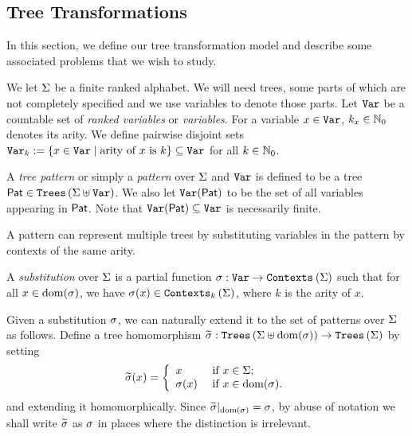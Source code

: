 \subsection{Tree Transformations}\label{subsec:model}

In this section, we define our tree transformation model and describe some associated problems that we wish to study. 

We let $\Sigma$ be a finite ranked alphabet. We will need trees, some parts of which are not completely specified and we use variables to denote those parts. Let $\texttt{Var}$ be a countable set of \emph{ranked variables} or \emph{variables}. For a variable $x \in \texttt{Var}$, $k_x \in \mathbb{N}_0$ denotes its arity. We define pairwise disjoint sets $\texttt{Var}_k := \{x \in \texttt{Var} \mid \mbox{arity of $x$ is $k$}\} \subseteq \texttt{Var}$ for all $k \in \mathbb{N}_0$.

\begin{definition}[Pattern]\label{def:pattern}
    A \emph{tree pattern} or simply a \emph{pattern} over $\Sigma$ and $\texttt{Var}$ is defined to be a tree $\mathsf{Pat} \in \texttt{Trees}\left(\Sigma \uplus \texttt{Var}\right)$. We also let \emph{$\texttt{Var}(\mathsf{Pat})$} to be the set of all variables appearing in $\mathsf{Pat}$. Note that $\texttt{Var}(\mathsf{Pat}) \subseteq \texttt{Var}$ is necessarily finite.
\end{definition}

A pattern can represent multiple trees by substituting variables  in the pattern by contexts of the same arity.
\begin{definition}[Substitution]\label{def:substitution}
    A \emph{substitution} over $\Sigma$ is a partial function $\sigma : \texttt{Var} \to \texttt{Contexts}_{}\left(\Sigma\right)$ such that for all $x \in \operatorname{dom}(\sigma)$, we have $\sigma(x) \in \texttt{Contexts}_{k}\left(\Sigma\right)$, where $k$ is the arity of $x$.
\end{definition}

Given a substitution $\sigma$, we can naturally extend it to the set of patterns over $\Sigma$ as follows. Define a tree homomorphism $\widetilde{\sigma} : \texttt{Trees}\left(\Sigma \uplus \operatorname{dom}(\sigma)\right) \to \texttt{Trees}\left(\Sigma\right)$ by setting
\[\widetilde{\sigma}(x) = \left\{ \begin{array}{ll} x & \mbox{ if } x \in \Sigma;\\ \sigma(x) & \mbox{ if } x \in \operatorname{dom}(\sigma). \end{array} \right.\]
and extending it homomorphically. Since $\widetilde{\sigma}|_{\operatorname{dom}(\sigma)} = \sigma$, by abuse of notation we shall write $\widetilde{\sigma}$ as $\sigma$ in places where the distinction is irrelevant.

